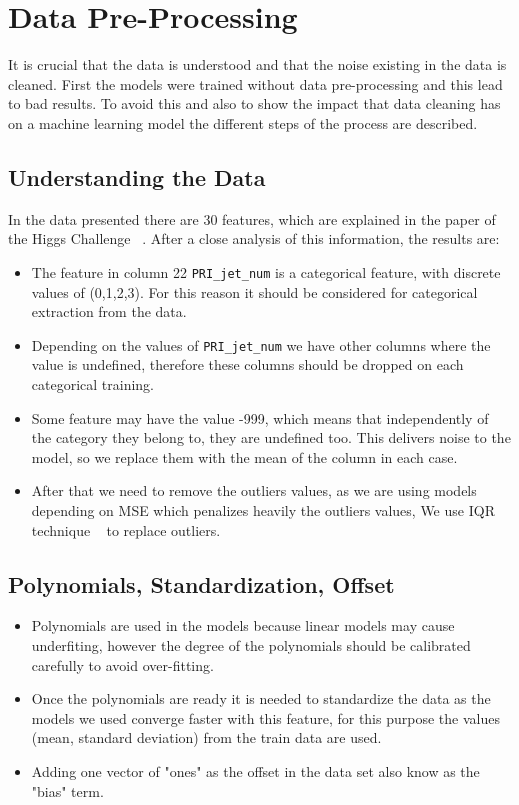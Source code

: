 \documentclass[10pt,conference,compsocconf]{IEEEtran}
\begin{document}
\section{Data Pre-Processing}

\label{sec:Data Pre-Processing}

It is crucial that the data is understood and that the noise existing in the 
data is cleaned. First the models were trained without data pre-processing
and this lead to bad results. To avoid this and also to 
show the impact that data cleaning has on a machine learning model the different
steps of the process are described.

\subsection{Understanding the Data}
In the data presented there are 30 features, which are explained in 
the paper of the Higgs Challenge ~\cite{higgs_challenge01}. After a 
close analysis of this information, the results are:

\begin{itemize}
 \label{text:categorical}
\item The feature in column 22 \texttt{PRI\_jet\_num} is a categorical feature,
with discrete values of (0,1,2,3). For this reason it should be considered
for categorical extraction from the data.
\item Depending on the values of \texttt{PRI\_jet\_num}  we have other columns
where the value is undefined, therefore these columns should be dropped 
on each categorical training.
\item Some feature may have the value -999, which means that
independently of the category they belong to, they are
undefined too. This delivers
noise to the model, so we replace them with the mean of the column in each
case.
\item After that we need to remove the outliers values, as we are using models
depending on MSE which penalizes heavily the outliers values, We use IQR technique ~\cite{IQR01} to replace outliers.

\end{itemize}

\subsection{Polynomials, Standardization, Offset}
 \label{text:datasteps}
\begin{itemize}
\item Polynomials are used in the models because linear models may cause
underfiting, however the degree of the polynomials should be calibrated carefully
to avoid over-fitting.
\item Once the polynomials are ready it is needed to standardize the data 
as the models we used converge faster with this feature, for this purpose 
the values (mean, standard deviation) from the train data  are used.
\item Adding one vector of "ones" as the offset in the data set also know as the
"bias" term.

\end{itemize}
\end{document}
